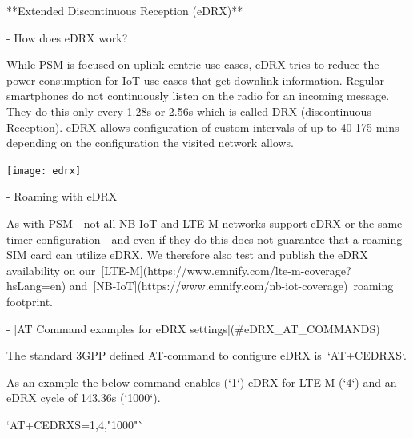 \documentclass[11pt, oneside]{article}   	%
\newcommand{\addspace}{\vspace{2mm}}
\begin{document}
\pagebreak[4]

\begin{markdown}

**Extended Discontinuous Reception (eDRX)**

\end{markdown}
\addspace
\begin{markdown}
- How does eDRX work?  
\end{markdown}
\addspace
\begin{markdown}
While PSM is focused on uplink-centric use cases, eDRX tries to reduce the power consumption for IoT use cases that get downlink information.
Regular smartphones do not continuously listen on the radio for an incoming message.
They do this only every 1.28s or 2.56s which is called DRX (discontinuous Reception).
eDRX allows configuration of custom intervals of up to 40-175 mins - depending on the configuration the visited network allows.
\end{markdown}
\addspace
\begin{center}
  \texttt{[image: edrx]}
\end{center}
\addspace
\begin{markdown}
- Roaming with eDRX  
\end{markdown}
\addspace
\begin{markdown}
As with PSM - not all NB-IoT and LTE-M networks support eDRX or the same timer configuration - and even if they do this does not guarantee that a roaming SIM card can utilize eDRX.
We therefore also test and publish the eDRX availability on our [LTE-M](https://www.emnify.com/lte-m-coverage?hsLang=en) and [NB-IoT](https://www.emnify.com/nb-iot-coverage) roaming footprint.
\end{markdown}
\addspace
\begin{markdown}
- [AT Command examples for eDRX settings](#eDRX_AT_COMMANDS)  
\end{markdown}
\addspace
\begin{markdown}

The standard 3GPP defined AT-command to configure eDRX is `AT+CEDRXS`.  

\end{markdown}
\addspace
\begin{markdown}

As an example the below command enables (`1`) eDRX for LTE-M (`4`) and an eDRX cycle of 143.36s (`1000`).

\end{markdown}
\addspace
\begin{markdown}

`AT+CEDRXS=1,4,"1000"`

\end{markdown}
\end{document}
